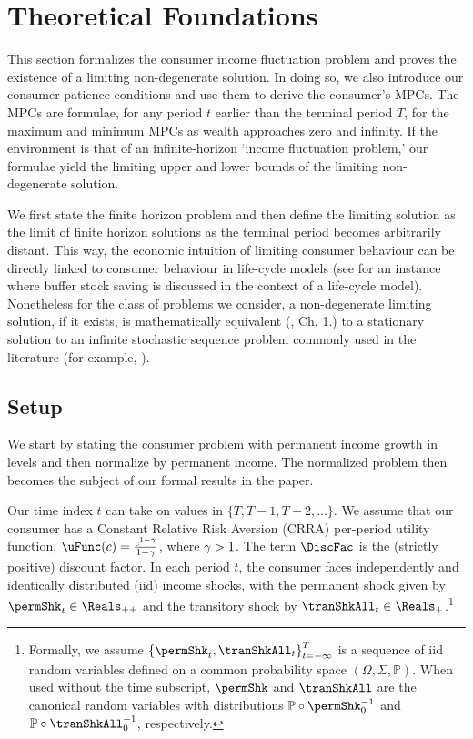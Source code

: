 \documentclass[BufferStockTheory]{subfiles}
\begin{document}
\hypertarget{The-Problem}{}
\section{Theoretical Foundations}\label{sec:Theory}

This section formalizes the consumer income fluctuation problem and proves the existence of a limiting non-degenerate solution. In doing so, we also introduce our consumer patience conditions and use them to derive the consumer's MPCs. The MPCs are formulae, for any period $t$ earlier than the terminal period $T$, for the maximum and minimum MPCs as wealth approaches zero and infinity.  If the environment is that of an infinite-horizon `income fluctuation problem,' our formulae yield the limiting upper and lower bounds of the limiting non-degenerate solution.


We first state the finite horizon problem and then define the limiting solution as the limit of finite horizon solutions as the terminal period becomes arbitrarily distant. This way, the economic intuition of limiting consumer behaviour can be directly linked to consumer behaviour in life-cycle models (see \cite{gpLifeCycle} for an instance where buffer stock saving is discussed in the context of a life-cycle model). Nonetheless for the class of problems we consider, a non-degenerate limiting solution, if it exists, is mathematically equivalent (\cite{bertsekas2012dynamic}, Ch. 1.) to a stationary solution to an infinite stochastic sequence problem commonly used in the literature (for example, \cite{mstIncFluct}). 

\label{sec:Foundations}
\subsection{Setup}\label{subsec:Setup}

We start by stating the consumer problem with permanent income growth in levels and then normalize by permanent income. The normalized problem then becomes the subject of our formal results in the paper. 

Our time index $t$ can take on values in $\{T,T-1,T-2,\dots \}$. We assume that our consumer has a Constant Relative Risk Aversion (CRRA) per-period utility function, $\uFunc(c)=\frac{c^{1-\CRRA}}{1-\CRRA}$, where $\gamma>1$. The term $\DiscFac$ is the (strictly positive) discount factor. In each period $t$, the consumer faces independently and identically distributed (iid) income shocks, with the permanent shock given by $\permShk_{t} \in \Reals_{++}$ and the transitory shock by $\tranShkAll_{t} \in \Reals_{+}$.\footnote{Formally, we assume $\left\{\permShk_{t},\tranShkAll_{t}\right\}_{t=-\infty}^{T}$ is a sequence of iid random variables defined on a common probability space $(\Omega, \Sigma, \mathbb{P})$. When used without the time subscript, $\permShk$ and $\tranShkAll$ are the canonical random variables with distributions $\mathbb{P}\circ \permShk_{0}^{-1}$ and $\mathbb{P}\circ \tranShkAll_{0}^{-1}$, respectively.}
\end{document}
